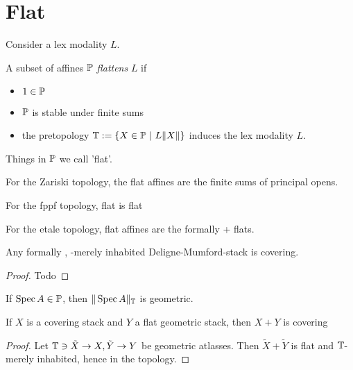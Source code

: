 \section{Flat}
Consider a lex modality $L$.
\begin{definition}
	A subset of affines $\mathbb{P}$ \emph{flattens} $L$ if
	\begin{itemize}
		\item $1 \in \mathbb{P}$
		\item $\mathbb{P}$ is stable under finite sums
		\item 	 the pretopology $\bT := \{ X \in \bP \ | \ L \| X \| \}$ induces the lex modality $L$.
	\end{itemize}
	
\end{definition}

Things in $\mathbb{P}$ we call 'flat'.
\begin{example}
	For the Zariski topology, the flat affines are the finite sums of principal opens.
\end{example}
\begin{example}
	For the fppf topology, flat is flat
\end{example}
\begin{example}
	For the etale topology, flat affines are the formally \etale + flats.
\end{example}
\begin{lemma}{\label{lemma:coveringDMstacks}}
	Any formally \etale, \etale-merely inhabited Deligne-Mumford-stack is covering.
\end{lemma}
\begin{proof}
	Todo
\end{proof}
\begin{lemma}
	If $\operatorname{Spec} A \in \mathbb{P}$, then $\| \operatorname{Spec} A\|_{\mathbb{T}}$ is geometric.
\end{lemma}
\begin{lemma}
	If $X$ is a covering stack and $Y$ a flat geometric stack, then $X + Y$ is covering
\end{lemma}
\begin{proof}
	Let $\mathbb{T} \ni \tilde X \to X, \tilde Y \to Y$ be geometric atlasses. Then $\tilde X+ \tilde Y$ is flat and $\mathbb{T}$-merely inhabited, hence in the topology.
\end{proof}


